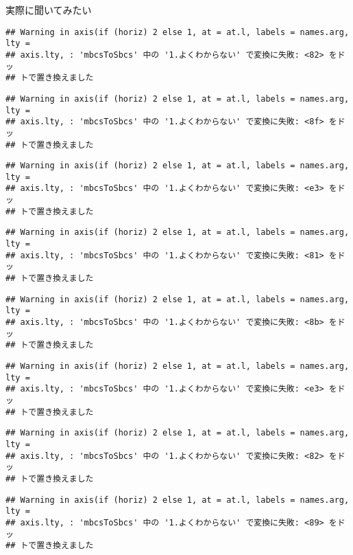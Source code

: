 \documentclass[ignorenonframetext,]{beamer}
\begin{document}
\begin{frame}[fragile]{実際に聞いてみたい}
\begin{verbatim}
## Warning in axis(if (horiz) 2 else 1, at = at.l, labels = names.arg, lty =
## axis.lty, : 'mbcsToSbcs' 中の '1.よくわからない' で変換に失敗: <82> をドッ
## トで置き換えました
\end{verbatim}

\begin{verbatim}
## Warning in axis(if (horiz) 2 else 1, at = at.l, labels = names.arg, lty =
## axis.lty, : 'mbcsToSbcs' 中の '1.よくわからない' で変換に失敗: <8f> をドッ
## トで置き換えました
\end{verbatim}

\begin{verbatim}
## Warning in axis(if (horiz) 2 else 1, at = at.l, labels = names.arg, lty =
## axis.lty, : 'mbcsToSbcs' 中の '1.よくわからない' で変換に失敗: <e3> をドッ
## トで置き換えました
\end{verbatim}

\begin{verbatim}
## Warning in axis(if (horiz) 2 else 1, at = at.l, labels = names.arg, lty =
## axis.lty, : 'mbcsToSbcs' 中の '1.よくわからない' で変換に失敗: <81> をドッ
## トで置き換えました
\end{verbatim}

\begin{verbatim}
## Warning in axis(if (horiz) 2 else 1, at = at.l, labels = names.arg, lty =
## axis.lty, : 'mbcsToSbcs' 中の '1.よくわからない' で変換に失敗: <8b> をドッ
## トで置き換えました
\end{verbatim}

\begin{verbatim}
## Warning in axis(if (horiz) 2 else 1, at = at.l, labels = names.arg, lty =
## axis.lty, : 'mbcsToSbcs' 中の '1.よくわからない' で変換に失敗: <e3> をドッ
## トで置き換えました
\end{verbatim}

\begin{verbatim}
## Warning in axis(if (horiz) 2 else 1, at = at.l, labels = names.arg, lty =
## axis.lty, : 'mbcsToSbcs' 中の '1.よくわからない' で変換に失敗: <82> をドッ
## トで置き換えました
\end{verbatim}

\begin{verbatim}
## Warning in axis(if (horiz) 2 else 1, at = at.l, labels = names.arg, lty =
## axis.lty, : 'mbcsToSbcs' 中の '1.よくわからない' で変換に失敗: <89> をドッ
## トで置き換えました
\end{verbatim}


\end{frame}
\end{document}
